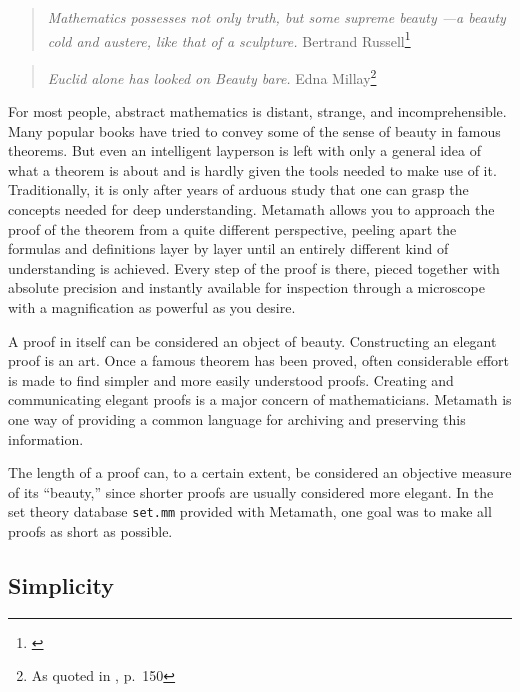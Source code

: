 \begin{quote}
  {\em Mathematics possesses not only truth, but some supreme beauty ---a
  beauty cold and austere, like that of a sculpture.}
    \flushright\sc  Bertrand
    Russell\footnote{\cite{Russell}}\\
\end{quote}

\begin{quote}
  {\em Euclid alone has looked on Beauty bare.}
  \flushright\sc Edna Millay\footnote{As quoted in \cite{Davis}, p.~150}\\
\end{quote}

For most people, abstract mathematics is distant, strange, and
incomprehensible.  Many popular books have tried to convey some of the sense
of beauty in famous theorems.  But even an intelligent layperson is left with
only a general idea of what a theorem is about and is hardly given the tools
needed to make use of it.  Traditionally, it is only after years of arduous
study that one can grasp the concepts needed for deep understanding.
Metamath allows you to approach the proof of the theorem from
a quite different perspective, peeling apart the formulas and definitions
layer by layer until an entirely different kind of understanding is achieved.
Every step of the proof is there, pieced together with absolute precision and
instantly available for inspection through a microscope with a magnification
as powerful as you desire.

A proof in itself can be considered an object of beauty.  Constructing an
elegant proof is an art.  Once a famous theorem has been proved, often
considerable effort is made to find simpler and more easily understood
proofs.  Creating and communicating elegant proofs is a major concern of
mathematicians.  Metamath is one way of providing a common language for
archiving and preserving this information.

The length of a proof can, to a certain extent, be considered an
objective measure of its ``beauty,'' since shorter proofs are usually
considered more elegant.  In the set theory database
\texttt{set.mm} provided
with Metamath, one goal was to make all proofs as short as possible.

\subsection{Simplicity}

